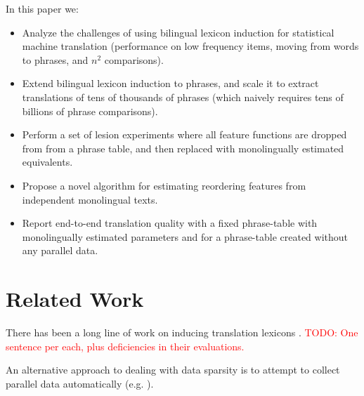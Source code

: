\documentclass[11pt]{article}
\newcommand{\todo}[1]{\textcolor{red}{TODO: #1}}
\newcommand{\secref}[1]{Section~\ref{#1}}
\begin{document}

In this paper we:
\begin{itemize}
\item Analyze the challenges of using bilingual lexicon induction for statistical machine translation (performance on low frequency items, moving from words to phrases, and $n^2$ comparisons).
\item Extend bilingual lexicon induction to phrases, and scale it to extract translations of tens of thousands of  phrases (which naively requires tens of billions of phrase comparisons). 
\item Perform a set of lesion experiments where all feature functions are dropped from from a phrase table, and then replaced with monolingually estimated equivalents.
\item Propose a novel algorithm for estimating reordering features from independent monolingual texts.
\item Report end-to-end translation quality with a fixed phrase-table with monolingually estimated parameters and for a phrase-table created without any parallel data.
\end{itemize}

\section{Related Work} \label{sect:related-work}

There has been a long line of work on inducing translation lexicons \cite{Rapp:1995,Rapp:1999}.
\todo{One sentence per each, plus deficiencies in their evaluations.}

An alternative approach to dealing with data sparsity is to attempt to collect parallel data automatically (e.g. \cite{Resnik:2003,Munteanu:2006,Smith:2010,Uszkoreit:2010}).
\end{document}
